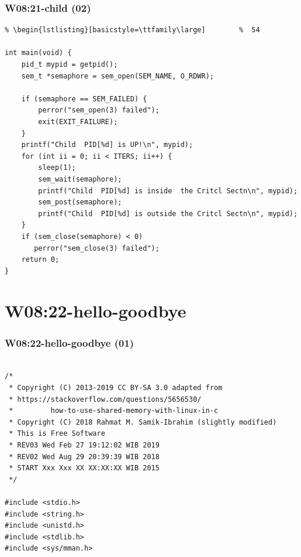 \documentclass[xcolor=table, notheorems, hyperref={pdfpagelabels=false}]{beamer}
\begin{document}
\begin{frame}[fragile]
\frametitle{W08:21-child (02)}
\begin{lstlisting}[basicstyle=\ttfamily\footnotesize] %  72
% \begin{lstlisting}[basicstyle=\ttfamily\small]        %  65
% \begin{lstlisting}[basicstyle=\ttfamily\large]        %  54

int main(void) {
    pid_t mypid = getpid();
    sem_t *semaphore = sem_open(SEM_NAME, O_RDWR);

    if (semaphore == SEM_FAILED) {
        perror("sem_open(3) failed");
        exit(EXIT_FAILURE);
    }
    printf("Child  PID[%d] is UP!\n", mypid);
    for (int ii = 0; ii < ITERS; ii++) {
        sleep(1);
        sem_wait(semaphore);
        printf("Child  PID[%d] is inside  the Critcl Sectn\n", mypid);
        sem_post(semaphore);
        printf("Child  PID[%d] is outside the Critcl Sectn\n", mypid);
    }
    if (sem_close(semaphore) < 0) 
       perror("sem_close(3) failed");
    return 0;
}

\end{lstlisting}
\end{frame}

\section{W08:22-hello-goodbye}
\begin{frame}[fragile]
\frametitle{W08:22-hello-goodbye (01)}
\begin{lstlisting}[basicstyle=\ttfamily\small]        %  65
% \begin{lstlisting}[basicstyle=\ttfamily\large]        %  54

/*
 * Copyright (C) 2013-2019 CC BY-SA 3.0 adapted from 
 * https://stackoverflow.com/questions/5656530/
 *         how-to-use-shared-memory-with-linux-in-c
 * Copyright (C) 2018 Rahmat M. Samik-Ibrahim (slightly modified)
 * This is Free Software
 * REV03 Wed Feb 27 19:12:02 WIB 2019
 * REV02 Wed Aug 29 20:39:39 WIB 2018
 * START Xxx Xxx XX XX:XX:XX WIB 2015
 */

#include <stdio.h>
#include <string.h>
#include <unistd.h>
#include <stdlib.h>
#include <sys/mman.h>

\end{lstlisting}
\end{frame}
\end{document}
